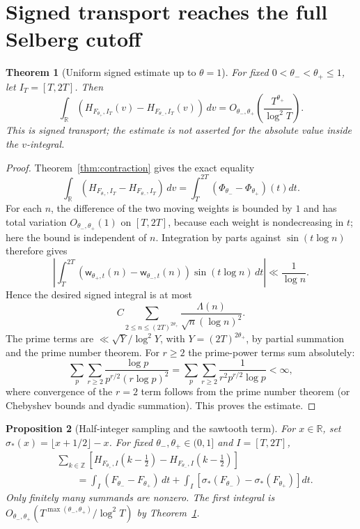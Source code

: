 \documentclass[11pt,leqno]{amsart}
\numberwithin{equation}{section}
\newtheorem{theorem}{Theorem}[section]
\newtheorem{proposition}[theorem]{Proposition}
\theoremstyle{definition}
\theoremstyle{remark}
\newcommand{\R}{\mathbb R}
\newcommand{\1}{\mathbf 1}
\newcommand{\wt}{\mathsf w}
\newcommand{\floor}[1]{\lfloor #1\rfloor}
\begin{document}
\section{Signed transport reaches the full Selberg cutoff}\label{sec:signed}
\begin{theorem}[Uniform signed estimate up to $\theta=1$]\label{thm:signed}
For fixed $0<\theta_-<\theta_+\le1$, let $I_T=[T,2T]$. Then
\begin{equation}\label{eq:signed-main}
 \boxed{\int_\R\left(H_{F_{\theta_+},I_T}(v)-H_{F_{\theta_-},I_T}(v)\right)\,dv
 =O_{\theta_-,\theta_+}\left(\frac{T^{\theta_+}}{\log^2T}\right).}
\end{equation}
This is signed transport; the estimate is not asserted for the absolute value inside the $v$-integral.
\end{theorem}
\begin{proof}
Theorem~\ref{thm:contraction} gives the exact equality
\[
 \int_\R(H_{F_{\theta_+},I_T}-H_{F_{\theta_-},I_T})\,dv
 =\int_T^{2T}(\Phi_{\theta_-}-\Phi_{\theta_+})(t)dt.
\]
For each $n$, the difference of the two moving weights is bounded by $1$ and has total variation $O_{\theta_-,\theta_+}(1)$ on $[T,2T]$, because each weight is nondecreasing in $t$; here the bound is independent of $n$. Integration by parts against $\sin(t\log n)$ therefore gives
\[
 \left|\int_T^{2T}(\wt_{\theta_+,t}(n)-\wt_{\theta_-,t}(n))\sin(t\log n)\,dt\right|\ll\frac1{\log n}.
\]
Hence the desired signed integral is at most
\[
 C\sum_{2\le n\le(2T)^{2\theta_+}}\frac{\Lambda(n)}{\sqrt n(\log n)^2}.
\]
The prime terms are $\ll\sqrt Y/\log^2Y$, with $Y=(2T)^{2\theta_+}$, by partial summation and the prime number theorem. For $r\ge2$ the prime-power terms sum absolutely:
\[
 \sum_p\sum_{r\ge2}\frac{\log p}{p^{r/2}(r\log p)^2}
 =\sum_p\sum_{r\ge2}\frac1{r^2p^{r/2}\log p}<\infty,
\]
where convergence of the $r=2$ term follows from the prime number theorem (or Chebyshev bounds and dyadic summation). This proves the estimate.
\end{proof}
\begin{proposition}[Half-integer sampling and the sawtooth term]\label{prop:saw-signed}
For $x\in\R$, set $\sigma_*(x)=\floor{x+1/2}-x$. For fixed $\theta_-,\theta_+\in(0,1]$ and $I=[T,2T]$,
\begin{equation}\label{eq:saw-identity}
 \begin{aligned}
 &\sum_{k\in\mathbb Z}
 [H_{F_{\theta_+},I}(k-\tfrac12)-H_{F_{\theta_-},I}(k-\tfrac12)]\\
 &\qquad=\int_I(F_{\theta_-}-F_{\theta_+})\,dt
 +\int_I[\sigma_*(F_{\theta_-})-\sigma_*(F_{\theta_+})]dt.
 \end{aligned}
\end{equation}
Only finitely many summands are nonzero. The first integral is $O_{\theta_-,\theta_+}(T^{\max(\theta_-,\theta_+)}/\log^2T)$ by Theorem~\ref{thm:signed}.
\end{proposition}
\end{document}
